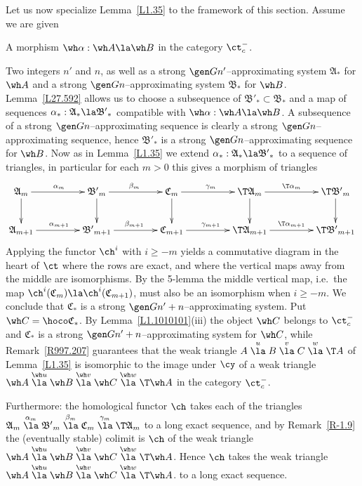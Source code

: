 \documentclass[11pt]{amsart}
\begin{document}
Let us now specialize Lemma~\ref{L1.35} to the framework of this section.
Assume we are given
\be
\item
A morphism $\wh\alpha:\wh A\la \wh B$ in the category $\ct^-_c$.
\item
Two integers $n'$ and $n$, as well as a strong $\gen G{n'}$--approximating
system $\mathfrak{A}_*$ for $\wh A$ and a
strong $\gen G{n}$--approximating
system $\mathfrak{B}_*$ for $\wh B$.
\setcounter{enumiv}{\value{enumi}}
\ee
Lemma~\ref{L27.592} allows us to choose a subsequence of
$\mathfrak{B'}_*\subset\mathfrak{B}_*$ and a map of sequences
$\alpha_*:\mathfrak{A}_*\la\mathfrak{B'}_*$ compatible with
$\wh\alpha:\wh A\la \wh B$.
A subsequence of a strong $\gen G{n}$--approximating sequence is
clearly a strong $\gen G{n}$--approximating sequence,
hence $\mathfrak{B'}_*$ is a strong $\gen G{n}$--approximating sequence for
$\wh B$.
Now 
as in Lemma~\ref{L1.35} we extend
$\alpha_*:\mathfrak{A}_*\la\mathfrak{B'}_*$ to a sequence of
triangles, in particular
for each $m>0$ this gives a morphism of triangles
\[\xymatrix@C+20pt{
  \mathfrak{A}_m\ar[r]^{\alpha_m}\ar[d] & \mathfrak{B'}_m\ar[d]\ar[r]^{\beta_m}
    & \mathfrak{C}_m\ar[r]^{\gamma_m}\ar[d]&\T \mathfrak{A}_m\ar[d]
\ar[r]^-{\T\alpha_m} &\T \mathfrak{B'}_m\ar[d]\\
  \mathfrak{A}_{m+1}\ar[r]^{\alpha_{m+1}}& \mathfrak{B'}_{m+1}\ar[r]^{\beta_{m+1}}&
  \mathfrak{C}_{m+1}\ar[r]^{\gamma_{m+1}} &\T \mathfrak{A}_{m+1}
\ar[r]^-{\T\alpha_{m+1}} &\T \mathfrak{B'}_{m+1}
}\]
Applying the functor $\ch^i$ with $i\geq-m$ yields a
commutative diagram in the heart of $\ct$ where the rows are exact, and where
the vertical maps away from the middle are isomorphisms.
By the 5-lemma the middle vertical map, i.e.~the map
$\ch^i(\mathfrak{C}_{m})\la\ch^i(\mathfrak{C}_{m+1})$, must also be an
isomorphism when $i\geq-m$.
We conclude that $\mathfrak{C}_*$ is a strong
$\gen G{n'+n}$--approximating system. Put $\wh C=\hoco\mathfrak{C}_*$.
By Lemma~\ref{L1.1010101}(iii) the object $\wh C$ belongs to $\ct^-_c$
and $\mathfrak{C}_*$ is a strong
$\gen G{n'+n}$--approximating system for $\wh C$,
while Remark~\ref{R997.207} guarantees that the weak triangle
$A\stackrel u\la B\stackrel v\la C\stackrel w\la\T A$
of Lemma~\ref{L1.35} is isomorphic
to the image under $\cy$ of a weak triangle
$\wh A\stackrel{\wh u}\la \wh B\stackrel{\wh v}\la\wh C\stackrel{\wh w}\la\T \wh A$
in the category $\ct^-_c$.

Furthermore: the homological functor $\ch$ takes each
of the triangles
$\mathfrak{A}_m\stackrel{\alpha_m}\la\mathfrak{B'}_m\stackrel{\beta_m}\la\mathfrak{C}_m\stackrel{\gamma_m}\la\T\mathfrak{A}_m$
to a long exact sequence, and by Remark~\ref{R-1.9} the
(eventually stable) colimit is
$\ch$ of the weak
triangle
$\wh A\stackrel{\wh u}\la \wh B\stackrel{\wh v}\la\wh C\stackrel{\wh w}\la\T \wh A$.
Hence $\ch$ takes the weak triangle
$\wh A\stackrel{\wh u}\la \wh B\stackrel{\wh v}\la\wh C\stackrel{\wh w}\la\T \wh A$.
to a long exact sequence.
\ermk
\end{document}
